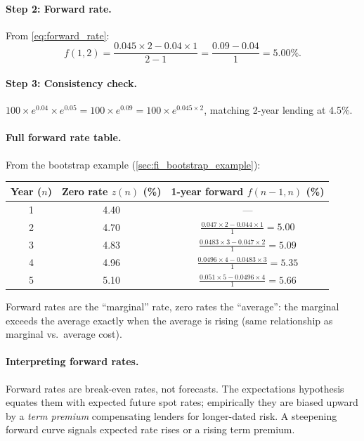 \paragraph{Step 2: Forward rate.}
From \cref{eq:forward_rate}:
\begin{equation}
  f(1,2) = \frac{0.045 \times 2 - 0.04 \times 1}{2 - 1}
         = \frac{0.09 - 0.04}{1} = 5.00\%.
  \label{eq:f12_example}
\end{equation}

\paragraph{Step 3: Consistency check.}
$100 \times e^{0.04} \times e^{0.05} = 100 \times e^{0.09} =
100 \times e^{0.045 \times 2}$, matching 2-year lending at 4.5\%.
\checkmark

\paragraph{Full forward rate table.}
From the bootstrap example (\cref{sec:fi_bootstrap_example}):

\begin{center}
\begin{tabular}{ccc}
\toprule
\textbf{Year ($n$)} & \textbf{Zero rate $z(n)$ (\%)} &
  \textbf{1-year forward $f(n{-}1,n)$ (\%)} \\
\midrule
1 & 4.40 & --- \\
2 & 4.70 & $\frac{0.047 \times 2 - 0.044 \times 1}{1} = 5.00$ \\
3 & 4.83 & $\frac{0.0483 \times 3 - 0.047 \times 2}{1} = 5.09$ \\
4 & 4.96 & $\frac{0.0496 \times 4 - 0.0483 \times 3}{1} = 5.35$ \\
5 & 5.10 & $\frac{0.051 \times 5 - 0.0496 \times 4}{1} = 5.66$ \\
\bottomrule
\end{tabular}
\end{center}

Forward rates are the ``marginal'' rate, zero rates the ``average'':
the marginal exceeds the average exactly when the average is
rising (same relationship as marginal vs.\ average cost).

\paragraph{Interpreting forward rates.}
Forward rates are break-even rates, not forecasts.  The expectations
hypothesis equates them with expected future spot rates; empirically
they are biased upward by a \emph{term premium} compensating lenders
for longer-dated risk.  A steepening forward curve signals expected
rate rises or a rising term premium.

